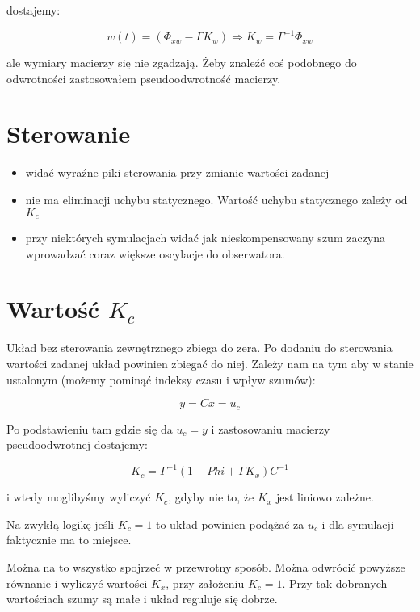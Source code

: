 \documentclass[a4paper]{article}
\begin{document}
dostajemy:

\[ w(t) = (\Phi_{xw} - \Gamma K_w) \Rightarrow K_w = \Gamma ^{-1} \Phi_{xw}\]

ale wymiary macierzy się nie zgadzają. Żeby znaleźć coś podobnego do odwrotności zastosowałem pseudoodwrotność macierzy.

\section{Sterowanie}
\begin{itemize}
\item widać wyraźne piki sterowania przy zmianie wartości zadanej 
\item nie ma eliminacji uchybu statycznego. Wartość uchybu statycznego zależy od $K_c$
\item przy niektórych symulacjach widać jak nieskompensowany szum zaczyna wprowadzać coraz większe oscylacje do obserwatora.
\end{itemize}

\section{Wartość $K_c$}
Układ bez sterowania zewnętrznego zbiega do zera. Po dodaniu do sterowania wartości zadanej układ powinien zbiegać do niej. Zależy nam na tym aby w stanie ustalonym (możemy pominąć indeksy czasu i wpływ szumów):

\[ y = Cx = u_c\]

Po podstawieniu tam gdzie się da $u_c=y$ i zastosowaniu macierzy pseudoodwrotnej dostajemy:

\[ K_c = \Gamma^{-1} (1-Phi+\Gamma K_x)C^{-1}\]

i wtedy moglibyśmy wyliczyć $K_c$, gdyby nie to, że $K_x$ jest liniowo zależne.

Na zwykłą logikę jeśli $K_c=1$ to układ powinien podążać za $u_c$ i dla symulacji faktycznie ma to miejsce. 

Można na to wszystko spojrzeć w przewrotny sposób. Można odwrócić powyższe równanie i wyliczyć wartości $K_x$, przy założeniu $K_c=1$. Przy tak dobranych wartościach szumy są małe i układ reguluje się dobrze.
\end{document}
